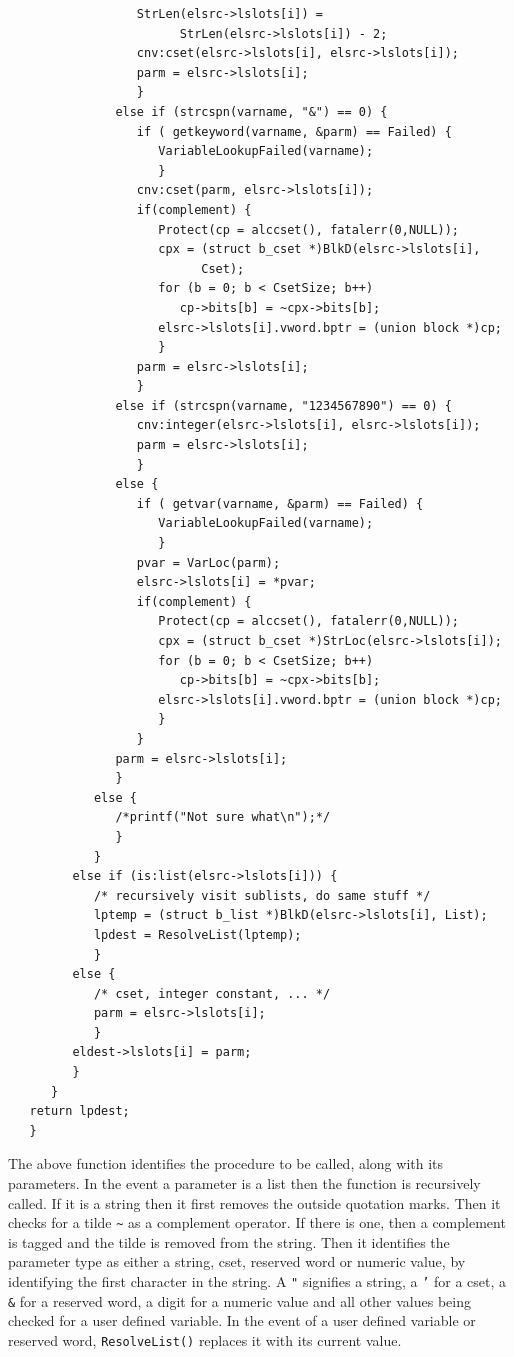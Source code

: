 \documentclass{article}
\begin{document}
\begin{verbatim}
                  StrLen(elsrc->lslots[i]) = 
                        StrLen(elsrc->lslots[i]) - 2;
                  cnv:cset(elsrc->lslots[i], elsrc->lslots[i]);
                  parm = elsrc->lslots[i];
                  }
               else if (strcspn(varname, "&") == 0) {
                  if ( getkeyword(varname, &parm) == Failed) {
                     VariableLookupFailed(varname);
                     }
                  cnv:cset(parm, elsrc->lslots[i]);
                  if(complement) {
                     Protect(cp = alccset(), fatalerr(0,NULL));
                     cpx = (struct b_cset *)BlkD(elsrc->lslots[i], 
                           Cset);
                     for (b = 0; b < CsetSize; b++) 
                        cp->bits[b] = ~cpx->bits[b];
                     elsrc->lslots[i].vword.bptr = (union block *)cp;
                     }
                  parm = elsrc->lslots[i];
                  }
               else if (strcspn(varname, "1234567890") == 0) {
                  cnv:integer(elsrc->lslots[i], elsrc->lslots[i]);
                  parm = elsrc->lslots[i];
                  }
               else {
                  if ( getvar(varname, &parm) == Failed) {
                     VariableLookupFailed(varname);
                     }
                  pvar = VarLoc(parm);
                  elsrc->lslots[i] = *pvar;
                  if(complement) {
                     Protect(cp = alccset(), fatalerr(0,NULL));
                     cpx = (struct b_cset *)StrLoc(elsrc->lslots[i]);
                     for (b = 0; b < CsetSize; b++) 
                        cp->bits[b] = ~cpx->bits[b];
                     elsrc->lslots[i].vword.bptr = (union block *)cp;
                     }
                  }
               parm = elsrc->lslots[i];
               }
            else {
               /*printf("Not sure what\n");*/
               }
            }
         else if (is:list(elsrc->lslots[i])) {
            /* recursively visit sublists, do same stuff */
            lptemp = (struct b_list *)BlkD(elsrc->lslots[i], List);
            lpdest = ResolveList(lptemp);
            }
         else { 
            /* cset, integer constant, ... */
            parm = elsrc->lslots[i];
            }
         eldest->lslots[i] = parm;
         }
      }
   return lpdest;
   }
\end{verbatim}
The above function identifies the procedure to be called, along with its parameters.  In the event a parameter is a list then the function is recursively called.  If it is a string then it first removes the outside quotation marks.  Then it checks for a tilde \texttt{\~} as a complement operator.  If there is one, then a complement is tagged and the tilde is removed from the string.  Then it identifies the parameter type as either a string, cset, reserved word or numeric value, by identifying the first character in the string.  A \texttt{"} signifies a string, a \texttt{'} for a cset, a \texttt{\&} for a reserved word, a digit for a numeric value and all other values being checked for a user defined variable.  In the event of a user defined variable or reserved word, \texttt{ResolveList()} replaces it with its current value.
\end{document}
